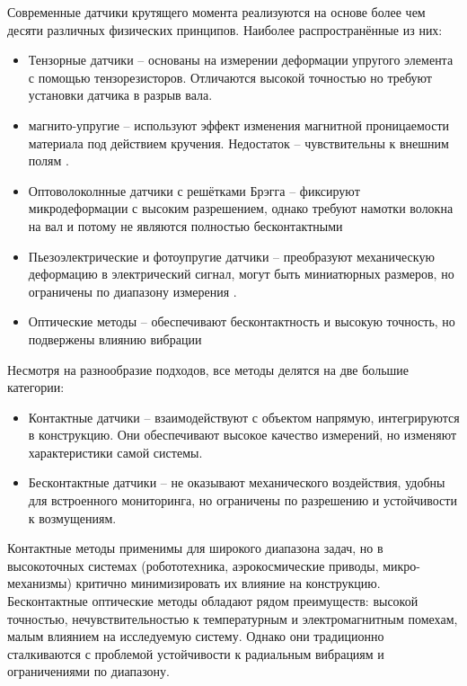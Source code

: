 Современные датчики крутящего момента реализуются на основе более чем десяти различных физических принципов. Наиболее распространённые из них:
\begin{itemize}
	\item Тензорные датчики -- основаны на измерении деформации упругого элемента с помощью тензорезисторов. Отличаются высокой точностью но требуют установки датчика в разрыв вала\cite{yeh2015digital,Hou2009,Mohammed2008,Chen2020}.
	\item магнито-упругие -- используют эффект изменения магнитной проницаемости материала под действием кручения. Недостаток -- чувствительны к внешним полям \cite{Shu2007}.
	\item Оптоволоколнные датчики с решётками Брэгга -- фиксируют микродеформации с высоким разрешением, однако требуют намотки волокна на вал и потому не являются полностью бесконтактными \cite{Zhu2021}%
	\item Пьезоэлектрические и фотоупругие датчики -- преобразуют механическую деформацию в электрический сигнал, могут быть миниатюрных размеров, но ограничены по диапазону измерения \cite{Bojtos2017,Hu2020}.
	\item Оптические методы -- обеспечивают бесконтактность и высокую точность, но подвержены влиянию вибрации \cite{Garinei2017,Sjodahl1996}
\end{itemize}
Несмотря на разнообразие подходов, все методы делятся на две большие категории:
\begin{itemize}
	\item Контактные датчики -- взаимодействуют с объектом напрямую, интегрируются в конструкцию. Они обеспечивают высокое качество измерений, но изменяют характеристики самой системы.
	\item Бесконтактные датчики -- не оказывают механического воздействия, удобны для встроенного мониторинга, но ограничены по разрешению и устойчивости к возмущениям. \cite{Wang2021} 	
\end{itemize} 

Контактные методы применимы для широкого диапазона задач, но в высокоточных системах (робототехника, аэрокосмические приводы, микро-механизмы) критично минимизировать их влияние на конструкцию. Бесконтактные оптические методы обладают рядом преимуществ: высокой точностью, нечувствительностью к температурным и электромагнитным помехам, малым влиянием на исследуемую систему. Однако они традиционно сталкиваются с проблемой устойчивости к радиальным вибрациям и ограничениями по диапазону.

